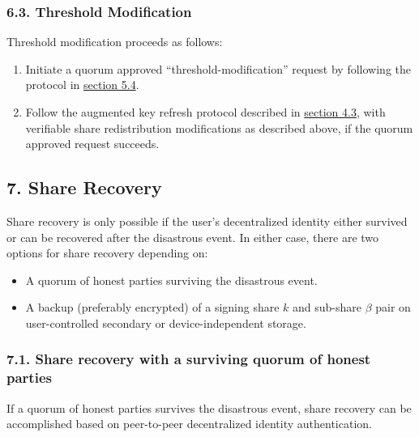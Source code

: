 \documentclass[
]{article}
\providecommand{\tightlist}{%
  \setlength{\itemsep}{0pt}\setlength{\parskip}{0pt}}
\begin{document}
\hypertarget{threshold-modification}{%
\subsubsection{6.3. Threshold
Modification}\label{threshold-modification}}

Threshold modification proceeds as follows:

\begin{enumerate}
\def\labelenumi{\arabic{enumi}.}
\tightlist
\item
  Initiate a quorum approved ``threshold-modification'' request by
  following the protocol in
  \protect\hyperlink{quorum-approved-request}{section 5.4}.
\item
  Follow the augmented key refresh protocol described in
  \protect\hyperlink{key-refresh}{section 4.3}, with verifiable share
  redistribution modifications as described above, if the quorum
  approved request succeeds.
\end{enumerate}

\hypertarget{share-recovery}{%
\subsection{7. Share Recovery}\label{share-recovery}}

Share recovery is only possible if the user's decentralized identity
either survived or can be recovered after the disastrous event. In
either case, there are two options for share recovery depending on:

\begin{itemize}
\tightlist
\item
  A quorum of honest parties surviving the disastrous event.
\item
  A backup (preferably encrypted) of a signing share \(k\) and sub-share
  \(\beta\) pair on user-controlled secondary or device-independent
  storage.
\end{itemize}

\hypertarget{share-recovery-quorum}{%
\subsubsection{7.1. Share recovery with a surviving quorum of honest
parties}\label{share-recovery-quorum}}

If a quorum of honest parties survives the disastrous event, share
recovery can be accomplished based on peer-to-peer decentralized
identity authentication.
\end{document}
